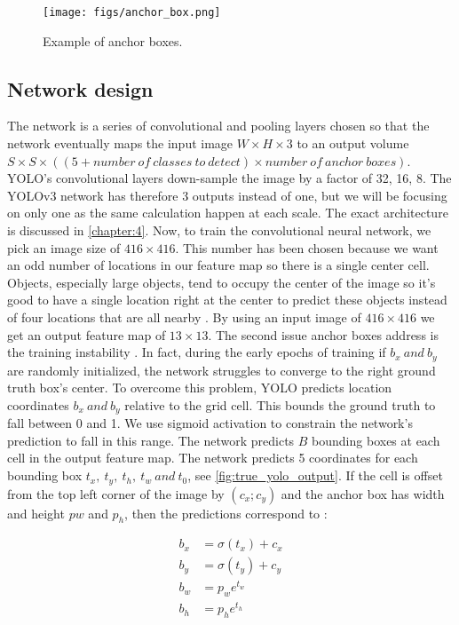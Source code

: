 \begin{figure}[!htbp]
  \centering
  \texttt{[image: figs/anchor\_box.png]}
  \caption[Example of anchor boxes]{Example of anchor boxes.}\label{fig:yolo_output}
\end{figure}


\subsection{Network design}\label{sub:net_design}

The network is a series of convolutional and pooling layers chosen so that the network eventually maps the input image $W \times H \times 3$ to
an output volume $S \times S \times ((5 + number\ of\ classes\ to\ detect) \times number\ of\ anchor\ boxes)$. YOLO's convolutional layers down-sample the image by a factor of 32, 16, 8. The YOLOv3 network has therefore 3 outputs instead of one, but we will be focusing on only one as the same calculation happen at each scale. The exact architecture is discussed in \cref{chapter:4}.
Now, to train the convolutional neural network, we pick an image size of $416 \times 416$.
This number has been chosen because we want an odd number of
locations in our feature map so there is a single center cell.
Objects, especially large objects, tend to occupy the center
of the image so it’s good to have a single location right at
the center to predict these objects instead of four locations
that are all nearby \cite{YOLOv2}.
By using an input image of $416 \times 416$ we get an output feature map of $13 \times 13$.
The second issue anchor boxes address is the training instability \cite{YOLOv2}. In fact, during the early epochs of training if $b_{x}\ and\ b_{y}$ are randomly initialized, the network
struggles to converge to the right ground truth box's center. To overcome this problem, YOLO predicts location coordinates $b_{x}\ and\ b_{y}$ relative to the grid
cell. This bounds the ground truth to fall between 0 and 1. We use sigmoid activation to constrain the network's prediction to fall in this range.
The network predicts $B$ bounding boxes at each cell in the output feature map. The network predicts 5 coordinates for each bounding box $t_{x},\ t_{y},\ t_{h},\ t_{w}\ and\ t_{0}$, see \cref{fig:true_yolo_output}. If the cell is
offset from the top left corner of the image by $(c_{x}; c_{y})$ and
the anchor box has width and height $p{w}$ and $p_{h}$, then
the predictions correspond to \cite{YOLOv2}:

\begin{align}
  \label{bbox}
  b_{x} &= \sigma(t_{x}) + c_x \\
  b_{y} &= \sigma(t_{y}) + c_y \\
  b_{w} &= p_{w}e^{t_{w}} \\
  b_{h} &= p_{h}e^{t_{h}}
\end{align}

